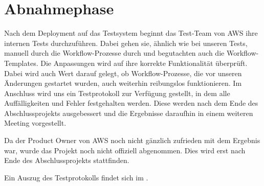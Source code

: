 \section{Abnahmephase}
\label{sec:Abnahmephase}

Nach dem Deployment auf das Testsystem beginnt das Test-Team von AWS ihre internen Tests durchzuführen.
Dabei gehen sie, ähnlich wie bei unseren Tests, manuell durch die Workflow-Prozesse durch und begutachten auch die Workflow-Templates.
Die Anpassungen wird auf ihre korrekte Funktionalität überprüft.
Dabei wird auch Wert darauf gelegt, ob Workflow-Prozesse, die vor unseren Änderungen gestartet wurden, auch weiterhin reibungslos funktionieren.
Im Anschluss wird uns ein Testprotokoll zur Verfügung gestellt, in dem alle Auffälligkeiten und Fehler festgehalten werden.
Diese werden nach dem Ende des Abschlussprojekts ausgebessert und die Ergebnisse daraufhin in einem weiteren Meeting vorgestellt.

Da der Product Owner von AWS noch nicht gänzlich zufrieden mit dem Ergebnis war, wurde das Projekt noch nicht offiziell abgenommen.
Dies wird erst nach Ende des Abschlussprojekts stattfinden.

Ein Auszug des Testprotokolls findet sich im .